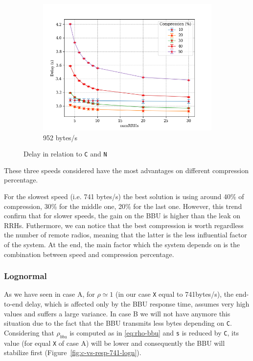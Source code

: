 \documentclass[11pt,a4paper,oneside, openright]{article}
\begin{document}
\begin{figure}[h]
\begin{subfigure}{.33\textwidth}
  \includegraphics[width=\linewidth]{images/n-vs-delay-s-952}
  \caption{952 bytes/s}
  \label{fig:n-vs-delay-s-952}
\end{subfigure}
\caption{Delay in relation to \texttt{C} and \texttt{N}}
\label{fig:n-vs-delay}
\end{figure}

These three speeds considered have the most advantages on different compression percentage. 

For the slowest speed (i.e. 741 bytes/s) the best solution is using around 40\% of compression, 30\% for the middle one, 20\% for the last one.
However, this trend confirm that for slower speeds, the gain on the BBU is higher than the leak on RRHs.
Futhermore, we can notice that the best compression is worth regardless the number of remote radios, meaning that the latter is the less influential factor of the system.
At the end, the main factor which the system depends on is the combination between speed and compression percentage.

\subsubsection{Lognormal}
As we have seen in case A, for $\rho \simeq 1$ (in our case \texttt{X} equal to 741bytes/s), the end-to-end delay, which is affected only by the BBU response time, assumes very high values and suffers a large variance. In case B we will not have anymore this situation due to the fact that the BBU transmits less bytes depending on \texttt{C}. Considering that $\rho_{bbu}$ is computed as in \ref{eq:rho-bbu} and \texttt{s} is reduced by \texttt{C}, its value (for equal \texttt{X} of case A) will be lower and consequently the BBU will stabilize first (Figure~\ref{fig:c-vs-resp-741-logn}).
\end{document}
